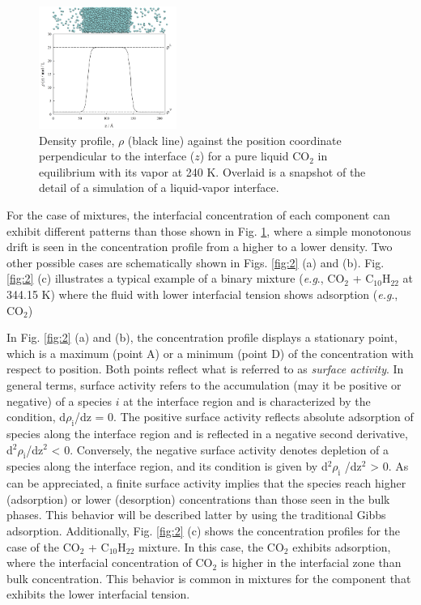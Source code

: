 \documentclass[9pt,tutorial]{livecoms}
\begin{document}
\begin{figure}
	\centering
  \includegraphics[width=0.4\textwidth]{gfx/image1.png}
  \caption{Density profile, ${\rho}$ (black line) against the position coordinate perpendicular to the interface ($z$) for a pure liquid CO$_{2}$ in equilibrium with its vapor at 240 K. Overlaid is a snapshot of the detail of a simulation of a liquid-vapor interface.}
  \label{fig:1}
\end{figure}

For the case of mixtures, the interfacial concentration of each component can
exhibit different patterns than those shown in Fig. \ref{fig:1}, where a simple
monotonous drift is seen in the concentration profile from a higher to a lower
density. Two other possible cases are schematically shown in Figs.
\ref{fig:2} (a) and (b). Fig. \ref{fig:2} (c) illustrates a typical example of a binary mixture
(\textit{e.g}., CO$_{2}$ + C$_{10}$H$_{22}$ at 344.15 K) where the fluid with
lower interfacial tension shows adsorption (\textit{e.g}., CO$_{2}$)

In Fig. \ref{fig:2} (a) and (b), the concentration profile displays a stationary point,
which is a maximum (point A) or a minimum (point D) of the concentration with
respect to position. Both points reflect what is referred to as \textit{surface
activity}. In general terms, surface activity refers to the accumulation (may
it be positive or negative) of a species $i$ at the interface region and
is characterized by the condition, d${\rho}_{\mathrm{i}}$/dz = 0. The
positive surface activity reflects absolute adsorption of species along the
interface region and is reflected in a negative second derivative,
d$^{2}{\rho}_{\mathrm{i}}$/dz$^{2}$ {\textless} 0. Conversely, the negative
surface activity denotes depletion of a species along the interface region, and
its condition is given by d$^{2}{\rho}_{\mathrm{i}}$ /dz$^{2}$
{\textgreater} 0. As can be appreciated, a finite surface activity implies that
the species reach higher (adsorption) or lower (desorption) concentrations than
those seen in the bulk phases. This behavior will be described latter by using
the traditional Gibbs adsorption. Additionally, Fig. \ref{fig:2} (c) shows the
concentration profiles for the case of the CO$_{2}$ + C$_{10}$H$_{22}$ mixture.
In this case, the CO$_{2}$ exhibits adsorption, where the interfacial
concentration of CO$_{2}$ is higher in the interfacial zone than bulk
concentration. This behavior is common in mixtures for the component that 
exhibits the lower interfacial tension.
\end{document}
